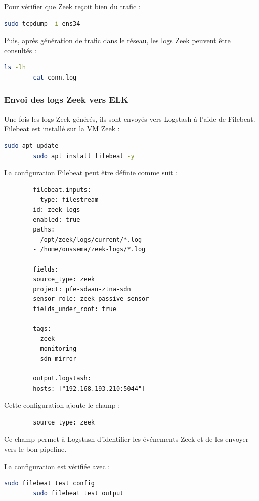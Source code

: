 \documentclass[12pt,a4paper,oneside]{report}
\begin{document}
	Pour vérifier que Zeek reçoit bien du trafic :
	
	\begin{lstlisting}[language=bash]
		sudo tcpdump -i ens34
	\end{lstlisting}
	
	Puis, après génération de trafic dans le réseau, les logs Zeek peuvent être consultés :
	
	\begin{lstlisting}[language=bash]
		ls -lh
		cat conn.log
	\end{lstlisting}
	
	\subsubsection{Envoi des logs Zeek vers ELK}
	
	Une fois les logs Zeek générés, ils sont envoyés vers Logstash à l'aide de Filebeat. Filebeat est installé sur la VM Zeek :
	
	\begin{lstlisting}[language=bash]
		sudo apt update
		sudo apt install filebeat -y
	\end{lstlisting}
	
	La configuration Filebeat peut être définie comme suit :
	
	\begin{lstlisting}
		filebeat.inputs:
		- type: filestream
		id: zeek-logs
		enabled: true
		paths:
		- /opt/zeek/logs/current/*.log
		- /home/oussema/zeek-logs/*.log
		
		fields:
		source_type: zeek
		project: pfe-sdwan-ztna-sdn
		sensor_role: zeek-passive-sensor
		fields_under_root: true
		
		tags:
		- zeek
		- monitoring
		- sdn-mirror
		
		output.logstash:
		hosts: ["192.168.193.210:5044"]
	\end{lstlisting}
	
	Cette configuration ajoute le champ :
	
	\begin{lstlisting}
		source_type: zeek
	\end{lstlisting}
	
	Ce champ permet à Logstash d'identifier les événements Zeek et de les envoyer vers le bon pipeline.
	
	La configuration est vérifiée avec :
	
	\begin{lstlisting}[language=bash]
		sudo filebeat test config
		sudo filebeat test output
	\end{lstlisting}
	
\end{document}
